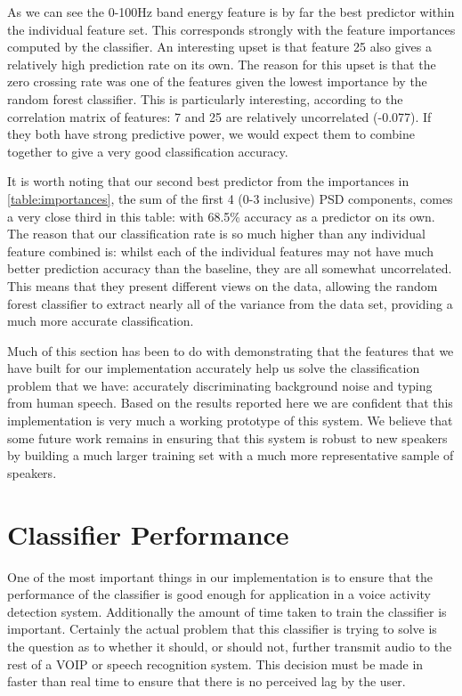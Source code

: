 \documentclass[ %
                    author={Sam Phippen},
                supervisor={Dr. Rafal Bogacz},
                     title={Real time voice activity detectors in noisy personal computing environments},
                  subtitle={},
                    degree={MEng},
                      year={2012} ]{thesis}
\begin{document}
As we can see the 0-100Hz band energy feature is by far the best predictor
within the individual feature set. This corresponds strongly with the feature
importances computed by the classifier. An interesting upset is that feature 25
also gives a relatively high prediction rate on its own. The reason for this
upset is that the zero crossing rate was one of the features given the lowest
importance by the random forest classifier. This is particularly interesting,
according to the correlation matrix of features: 7 and 25 are relatively
uncorrelated (-0.077). If they both have strong predictive power, we would
expect them to combine together to give a very good classification accuracy.

It is worth noting that our second best predictor from the importances in
\ref{table:importances}, the sum of the first 4 (0-3 inclusive) PSD components,
comes a very close third in this table: with 68.5\% accuracy as a predictor on
its own. The reason that our classification rate is so much higher than any
individual feature combined is: whilst each of the individual features may not
have much better prediction accuracy than the baseline, they are all somewhat
uncorrelated. This means that they present different views on the data,
allowing the random forest classifier to extract nearly all of the variance
from the data set, providing a much more accurate classification.

Much of this section has been to do with demonstrating that the features that
we have built for our implementation accurately help us solve the
classification problem that we have: accurately discriminating background noise
and typing from human speech. Based on the results reported here we are
confident that this implementation is very much a working prototype of this
system. We believe that some future work remains in ensuring that this system
is robust to new speakers by building a much larger training set with a much
more representative sample of speakers.

\section{Classifier Performance}

One of the most important things in our implementation is to ensure that the
performance of the classifier is good enough for application in a voice activity
detection system. Additionally the amount of time taken to train the classifier
is important. Certainly the actual problem that this classifier is trying to
solve is the question as to whether it should, or should not, further transmit
audio to the rest of a VOIP or speech recognition system. This decision must be
made in faster than real time to ensure that there is no perceived lag by the
user.
\end{document}
